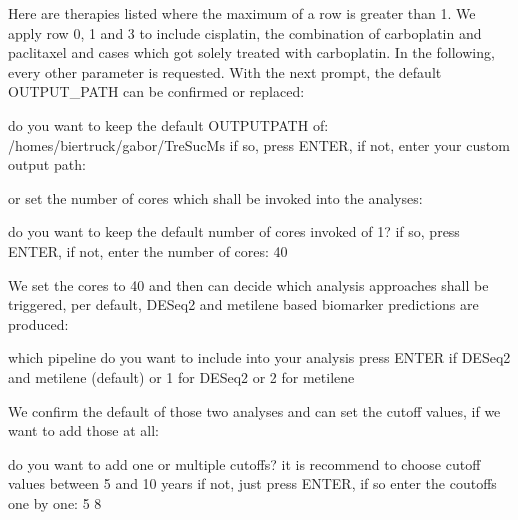 \documentclass[letterpaper,10pt,english]{sphinxmanual}
\begin{document}
\sphinxAtStartPar
Here are therapies listed where the maximum of a row is greater than 1. We
apply row 0, 1 and 3 to include cisplatin, the combination of carboplatin and
paclitaxel and cases which got solely treated with carboplatin. In the
following, every other parameter is requested. With the next prompt, the
default OUTPUT\_PATH can be confirmed or replaced:

\begin{sphinxVerbatim}[commandchars=\\\{\}]
do you want to keep the default OUTPUT\PYGZus{}PATH of:
/homes/biertruck/gabor/TreSucMs
if so, press ENTER, if not, enter your custom output path:
\end{sphinxVerbatim}
\begin{description}
\sphinxAtStartPar
or set the number of cores which shall be invoked into the analyses:

\end{description}

\begin{sphinxVerbatim}[commandchars=\\\{\}]
do you want to keep the default number of cores invoked of 1?
if so, press ENTER, if not, enter the number of cores:
40
\end{sphinxVerbatim}

\sphinxAtStartPar
We set the cores to 40 and then can decide which analysis approaches shall be
triggered, per default, DESeq2 and metilene based biomarker predictions are
produced:

\begin{sphinxVerbatim}[commandchars=\\\{\}]
which pipeline do you want to include into your analysis
press ENTER if DESeq2 and metilene (default) or
1 for DESeq2 or
2 for metilene
\end{sphinxVerbatim}

\sphinxAtStartPar
We confirm the default of those two analyses and can set the cutoff values, if
we want to add those at all:

\begin{sphinxVerbatim}[commandchars=\\\{\}]
do you want to add one or multiple cutoffs?
it is recommend to choose cutoff values between 5 and 10 years
if not, just press ENTER, if so enter the coutoffs one by one:
5
8
\end{sphinxVerbatim}
\end{document}
